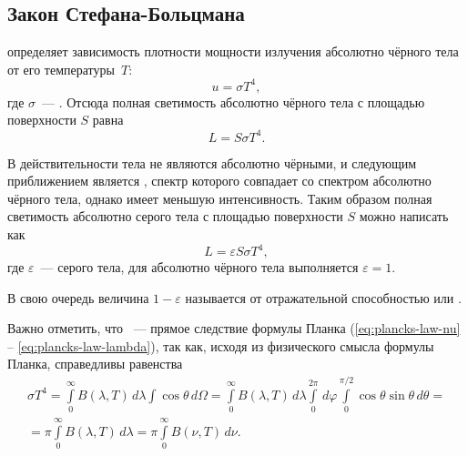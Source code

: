 \subsection{Закон Стефана-Больцмана}
\label{subsec:stef-boltz-law}
 определяет зависимость плотности мощности излучения абсолютно чёрного тела от его температуры~$T$:
\begin{equation}
    u = \sigma T^4,
\end{equation}
где $\sigma$~--- .
Отсюда полная светимость абсолютно чёрного тела с площадью поверхности $S$ равна
\begin{equation}
    L = S \sigma T^4.
    \label{eq:steff-bol-law}
\end{equation}

В действительности тела не являются абсолютно чёрными, и следующим приближением является , спектр которого совпадает со спектром абсолютно чёрного тела, однако имеет меньшую интенсивность. Таким образом полная светимость абсолютно серого тела с площадью поверхности $S$ можно написать как
\begin{equation}
    L = \varepsilon S \sigma T^4,
\end{equation}
где $\varepsilon$~---  серого тела, для абсолютно чёрного тела выполняется $\varepsilon = 1$. 

В свою очередь величина $1 - \varepsilon$ называется от отражательной способностью или .

Важно отметить, что ~--- прямое следствие формулы Планка (\ref{eq:plancks-law-nu} -- \ref{eq:plancks-law-lambda}), так как, исходя из физического смысла формулы Планка, справедливы равенства
\begin{multline}
    \sigma T^4
    = \int\limits^\infty_0 B(\lambda, T) \,d \lambda \int \cos \theta \, d \Omega = \int\limits^\infty_0 B(\lambda, T) \,d \lambda \int\limits_0^{2 \pi} \, d \varphi \int\limits_0^{\pi / 2} \cos \theta \sin \theta \, d \theta = \\
    = \pi \int\limits^\infty_0 B(\lambda, T) \,d \lambda 
    = \pi \int\limits^\infty_0 B(\nu, T) \,d \nu.
\end{multline}

